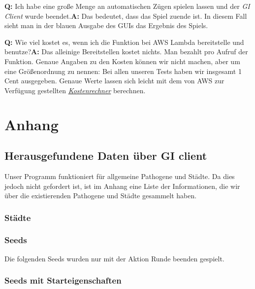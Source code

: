 \documentclass{article}
\newcommand{\faqentry}[2]{\noindent\textbf{Q:} #1\newline\newline\textbf{A:} #2\newline\newline\newline} %
\newcommand{\gquote}[1]{\glqq #1\grqq} %
\let\oldgls\gls
\renewcommand{\gls}[1]{\emph{\oldgls{#1}}} %
\begin{document}
\faqentry{Ich habe eine große Menge an automatischen Zügen spielen lassen und der \gls{GI Client} wurde beendet.}{Das bedeutet, dass das Spiel zuende ist. In diesem Fall sieht man in der blauen Ausgabe des GUIs das Ergebnis des Spiels.}

\faqentry{Wie viel kostet es, wenn ich die Funktion bei AWS Lambda bereitstelle und benutze?}{Das alleinige Bereitstellen kostet nichts. Man bezahlt pro Aufruf der Funktion. Genaue Angaben zu den Kosten können wir nicht machen, aber um eine Größenordnung zu nennen: Bei allen unseren Tests haben wir insgesamt 1 Cent ausgegeben. Genaue Werte lassen sich leicht mit dem von AWS zur Verfügung gestellten \emph{\href{https://calculator.aws/\#/createCalculator?displayType=singleService&locale=de-DE&region=us-east-2&serviceCode=aWSLambda}{Kostenrechner}} berechnen.}

\section{Anhang}
\label{sec:Anhang}
\subsection{Herausgefundene Daten über GI client}
Unser Programm funktioniert für allgemeine Pathogene und Städte. Da dies jedoch nicht gefordert ist, ist im Anhang eine Liste der Informationen, die wir über die existierenden Pathogene und Städte gesammelt haben.



\subsubsection{Städte}


\subsubsection{Seeds}
Die folgenden Seeds wurden nur mit der Aktion \gquote{Runde beenden} gespielt.


\subsubsection{Seeds mit Starteigenschaften}
\end{document}
